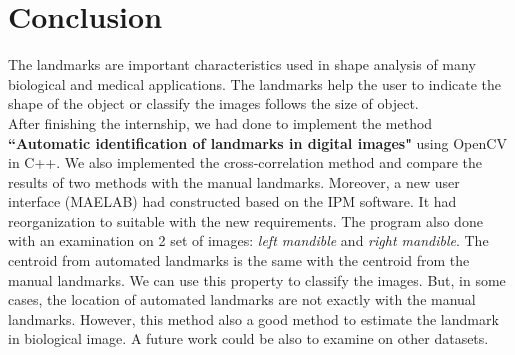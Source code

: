 \chapter*{Conclusion}
\indent The landmarks are important characteristics used in shape analysis of many biological and medical applications. The landmarks help the user to indicate the shape of the object or classify the images follows the size of object.\\
After finishing the internship, we had done to implement the method \textbf{``Automatic identification of landmarks in digital images"} using OpenCV in C++. We also implemented the cross-correlation method and compare the results of two methods with the manual landmarks. Moreover, a new user interface (MAELAB) had constructed based on the IPM software. It had reorganization to suitable with the new requirements. The program also done with an examination on 2 set of images: \textit{left mandible} and \textit{right mandible}. The centroid from automated landmarks is the same with the centroid from the manual landmarks. We can use this property to classify the images. But, in some cases, the location of automated landmarks are not exactly with the manual landmarks. However, this method also a good method to estimate the landmark in biological image. A future work could be also to examine on other datasets.